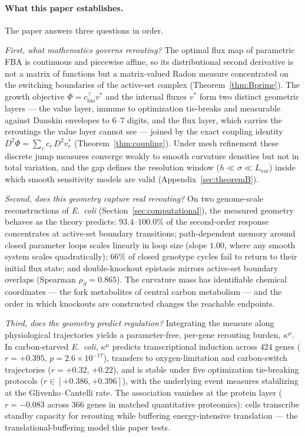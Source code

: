 \documentclass[11pt,a4paper]{article}
\theoremstyle{plain}
\theoremstyle{definition}
\theoremstyle{remark}
\newcommand{\kmu}{\kappa^{\mu}}
\begin{document}
\paragraph{What this paper establishes.}
The paper answers three questions in order.

\emph{First, what mathematics governs rerouting?} The optimal flux map
of parametric FBA is continuous and piecewise affine, so its
distributional second derivative is not a matrix of functions but a
matrix-valued Radon measure concentrated on the switching boundaries of
the active-set complex (Theorem~\ref{thm:Bprime}). The growth objective
$\Phi = c_{\mathrm{bio}}^\top v^*$ and the internal fluxes $v^*$ form
two distinct geometric layers --- the value layer, immune to
optimization tie-breaks and measurable against Danskin envelopes to
$6$--$7$ digits, and the flux layer, which carries the reroutings the
value layer cannot see --- joined by the exact coupling identity
$D^2 \Phi = \sum_r c_r\, D^2 v^*_r$ (Theorem~\ref{thm:coupling}).
Under mesh refinement these discrete jump measures converge weakly to
smooth curvature densities but not in total variation, and the gap
defines the resolution window ($h \ll \sigma \ll L_{\mathrm{var}}$)
inside which smooth sensitivity models are valid
(Appendix~\ref{sec:theoremB}).

\emph{Second, does this geometry capture real rerouting?} On two
genome-scale reconstructions of \emph{E.~coli}
(Section~\ref{sec:computational}), the measured geometry behaves as
the theory predicts: $93.4$--$100.0\%$ of the second-order response
concentrates at active-set boundary transitions; path-dependent memory
around closed parameter loops scales linearly in loop size (slope
$1.00$, where any smooth system scales quadratically); $66\%$ of
closed genotype cycles fail to return to their initial flux state; and
double-knockout epistasis mirrors active-set boundary overlaps
(Spearman $\rho_S = 0.865$). The curvature mass has identifiable
chemical coordinates --- the fork metabolites of central carbon
metabolism --- and the order in which knockouts are constructed
changes the reachable endpoints.

\emph{Third, does the geometry predict regulation?} Integrating the
measure along physiological trajectories yields a parameter-free,
per-gene rerouting burden, $\kmu$. In carbon-starved \emph{E.~coli},
$\kmu$ predicts transcriptional induction across $424$ genes
($r = +0.395$, $p = 2.6 \times 10^{-17}$), transfers to
oxygen-limitation and carbon-switch trajectories ($r = +0.32$,
$+0.22$), and is stable under five optimization tie-breaking protocols
($r \in [+0.386, +0.396]$), with the underlying event measures
stabilizing at the Glivenko--Cantelli rate. The association vanishes
at the protein layer ($r = -0.083$ across $366$ genes in matched
quantitative proteomics): cells transcribe standby capacity for
rerouting while buffering energy-intensive translation --- the
translational-buffering model this paper tests.
\end{document}
